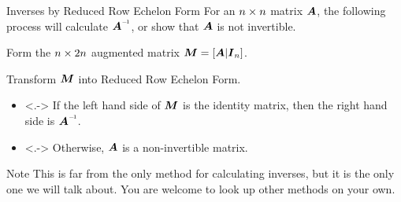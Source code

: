 \documentclass{beamer}
\begin{document}
\begin{frame}
\begin{block}{Inverses by Reduced Row Echelon Form}
For an $n\times n$ matrix $\boldsymbol{A}$, the following process will calculate $\inverseof{\mat{A}}$, or show that $\boldsymbol{A}$ is not invertible.
\begin{description}
\item<+->[Step 1:] Form the $n\times 2n$ augmented matrix $\boldsymbol{M}=[\boldsymbol{A}|\boldsymbol{I}_{n}]$.
\item<+->[Step 2:] Transform $\boldsymbol{M}$ into Reduced Row Echelon Form.
\item<+->[Step 3:] 
\begin{itemize}
\item<.-> If the left hand side of $\boldsymbol{M}$ is the identity matrix, then the right hand side is $\inverseof{\mat{A}}$.
\item<.-> Otherwise, $\boldsymbol{A}$ is a non-invertible matrix.
\end{itemize}
\end{description}
\end{block}

\onslide<+->
\begin{block}{Note}
This is far from the only method for calculating inverses, but it is the only one we will talk about. You are welcome to look up other methods on your own.
\end{block}
\end{frame}
\end{document}
